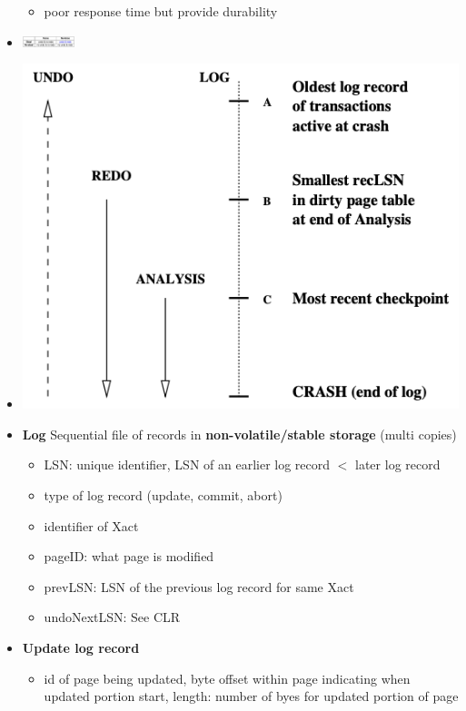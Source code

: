 \documentclass[8pt, landscape]{extarticle}
\begin{document}
\begin{multicols*}{4}
\begin{itemize}
\begin{itemize}
      \item poor response time but provide durability
    \end{itemize}
    \item \includegraphics[width=0.12\textwidth]{cs3223-steal-force.png}
  \end{itemize}
\begin{itemize}
  \item \includegraphics[scale=0.15]{cs3223-aries-three-phases.png}
  \item \textbf{Log} Sequential file of records in \textbf{non-volatile/stable storage} (multi copies)
  \begin{itemize}
    \item LSN: unique identifier, LSN of an earlier log record $<$ later log record
    \item type of log record (update, commit, abort)
    \item identifier of Xact
    \item pageID: what page is modified 
    \item prevLSN: LSN of the previous log record for same Xact
    \item undoNextLSN: See CLR
  \end{itemize}
  \item \textbf{Update log record}
  \begin{itemize}
    \item id of page being updated, byte offset within page indicating when updated portion start, length: number of byes for updated portion of page

\end{itemize}
\end{itemize}
\end{multicols*}
\end{document}
